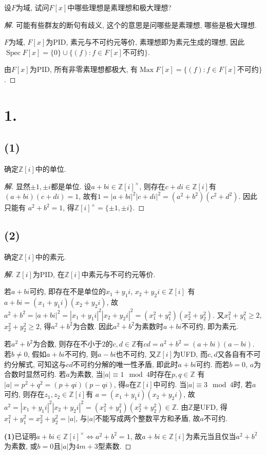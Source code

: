 \documentclass[12pt, a4paper, fontset=windows]{ctexart}
\newcommand{\Z}{\mathbb{Z}}
\newcommand{\Max}{\operatorname{Max}}
\newcommand{\Spec}{\operatorname{Spec}}
\newcommand{\abs}[1]{\left|{#1}\right|}
\newenvironment{solution}{\begin{proof}[解]}{\end{proof}}
\begin{document}
设$F$为域, 试问$F[x]$中哪些理想是素理想和极大理想? 

\begin{solution}
可能有些群友的断句有歧义, 这个的意思是问哪些是素理想, 哪些是极大理想. 

$F$为域, $F[x]$为PID, 素元与不可约元等价, 
素理想即为素元生成的理想, 
因此$\Spec F[x]=\{0\}\cup\{(f):f\in F[x]$不可约$\}$. 

由$F[x]$为PID, 所有非零素理想都极大, 有$\Max F[x]=\{(f):f\in F[x]$不可约$\}$. 
\end{solution}

\section*{1.}
\label{Zi-unit-prime}

\subsection*{(1)}

确定$\Z[i]$中的单位. 

\begin{solution}
显然$\pm 1,\pm i$都是单位. 
设$a+bi\in\Z[i]^{\times}$, 则存在$c+di\in\Z[i]$有$(a+bi)(c+di)=1$, 
故有$1=\abs{a+bi}^2\abs{c+di}^2=(a^2+b^2)(c^2+d^2)$. 因此只能有
$a^2+b^2=1$, 得$\Z[i]^{\times}=\{\pm 1,\pm i\}$. 
\end{solution}

\subsection*{(2)}

确定$\Z[i]$中的素元. 

\begin{solution}
$\Z[i]$为PID, 在$\Z[i]$中素元与不可约元等价. 

若$a+bi$可约, 即存在不是单位的$x_1+y_1i$, $x_2+y_2i\in\Z[i]$
有$a+bi=(x_1+y_1i)(x_2+y_2i)$, 故
$a^2+b^2=\abs{a+bi}^2=\abs{x_1+y_1i}^2\abs{x_2+y_2i}^2=(x_1^2+y_1^2)(x_2^2+y_2^2)$. 
又$x_1^2+y_1^2\ge 2$, $x_2^2+y_2^2\ge 2$, 得$a^2+b^2$为合数. 
因此$a^2+b^2$为素数时$a+bi$不可约, 即为素元. 

若$a^2+b^2$为合数, 则存在不小于$2$的$c,d\in\Z$有$cd=a^2+b^2=(a+bi)(a-bi)$. 
若$b\ne 0$, 假如$a+bi$不可约, 则$a-bi$也不可约, 又$\Z[i]$为UFD, 
而$c,d$又各自有不可约分解式, 可知这与$cd$不可约分解的唯一性矛盾, 即此时$a+bi$可约. 
而若$b=0$, $a$为合数时显然可约. 若$a$为素数, 当$\abs{a}\equiv 1\mod{4}$时存在$p,q\in\Z$
有$\abs{a}=p^2+q^2=(p+qi)(p-qi)$, 得$a$在$\Z[i]$中可约. 
当$\abs{a}\equiv 3\mod{4}$时, 若$a$可约, 则存在$z_1,z_2\in\Z[i]$有
$a=(x_1+y_1i)(x_2+y_2i)$, 故$a^2=\abs{x_1+y_1i}^2\abs{x_2+y_2i}^2=(x_1^2+y_1^2)(x_2^2+y_2^2)\in\Z$. 
由$\Z$是UFD, 得$x_1^2+y_1^2=x_2^2+y_2^2=\abs{a}$, 
与$\abs{a}$不能写成两个整数平方和矛盾, 故$a$不可约. 

{\bf (1)}已证明$a+bi\in\Z[i]^{\times}\iff a^2+b^2=1$, 
故$a+bi\in\Z[i]$为素元当且仅当$a^2+b^2$为素数, 或$b=0$且$\abs{a}$为$4m+3$型素数. 
\end{solution}
\end{document}
